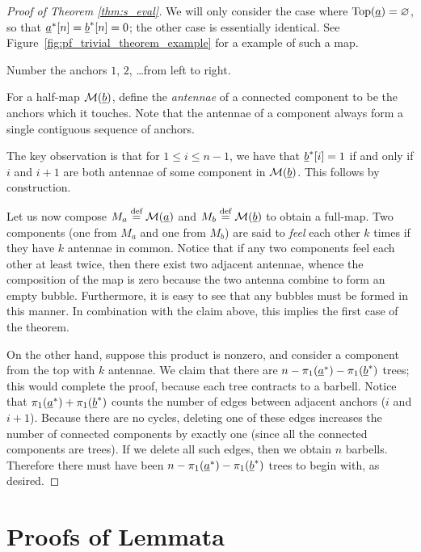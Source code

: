 \begin{proof}[Proof of Theorem \ref{thm:s_eval}]
	We will only consider the case where $\operatorname{Top}(\underline{a}) = \varnothing$, so that $\underline{a}^\ast[n] = \underline{b}^\ast[n] = 0$; the other case is essentially identical.  See Figure~\ref{fig:pf_trivial_theorem_example} for a example of such a map.

	Number the anchors $1$, $2$, \dots from left to right.

	For a half-map $\mathcal M(\underline{b})$, define the \emph{antennae} of a connected component to be the anchors which it touches.  Note that the antennae of a component always form a single contiguous sequence of anchors.

	The key observation is that for $1 \le i \le n-1$, we have that $\underline{b}^\ast[i] = 1$ if and only if $i$ and $i+1$ are both antennae of some component in $\mathcal M(\underline{b})$.  This follows by construction.

	Let us now compose $M_a \stackrel{\text{def}}{=} \mathcal M(\underline{a})$ and $M_b \stackrel{\text{def}}{=} \mathcal M(\underline{b})$ to obtain a full-map.  Two components (one from $M_a$ and one from $M_b$) are said to \emph{feel} each other $k$ times if they have $k$ antennae in common.  Notice that if any two components feel each other at least twice, then there exist two adjacent antennae, whence the composition of the map is zero because the two antenna combine to form an empty bubble.  Furthermore, it is easy to see that any bubbles must be formed in this manner.  In combination with the claim above, this implies the first case of the theorem.

	On the other hand, suppose this product is nonzero, and consider a component from the top with $k$ antennae.  We claim that there are $n - \pi_1(\underline{a}^\ast) - \pi_1(\underline{b}^\ast)$ trees; this would complete the proof, because each tree contracts to a barbell.  Notice that $\pi_1(\underline{a}^\ast) + \pi_1(\underline{b}^\ast)$ counts the number of edges between adjacent anchors ($i$ and $i+1$).  Because there are no cycles, deleting one of these edges increases the number of connected components by exactly one (since all the connected components are trees).  If we delete all such edges, then we obtain $n$ barbells.  Therefore there must have been $n - \pi_1(\underline{a}^\ast) - \pi_1(\underline{b}^\ast)$ trees to begin with, as desired.
\end{proof}

\section{Proofs of Lemmata}
\label{sec:lemmata_proof}
